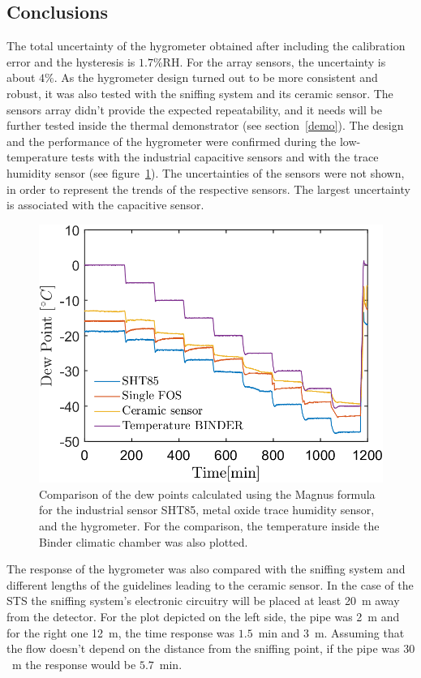 \subsection{Conclusions}
The total uncertainty of the hygrometer obtained after including the calibration error and the hysteresis is $1.7$\%RH. For the array sensors, the uncertainty is about $4\%$.
As the hygrometer design turned out to be more consistent and robust, it was also tested with the sniffing system and its ceramic sensor. The sensors array didn't provide the expected repeatability, and it needs will be further tested inside the thermal demonstrator (see section~\ref{demo}). The design and the performance of the hygrometer were confirmed during the low-temperature tests with the industrial capacitive sensors and with the trace humidity sensor (see figure~\ref{fig_comparison}). The uncertainties of the sensors were not shown, in order to represent the trends of the respective sensors. The largest uncertainty is associated with the capacitive sensor. 
\begin{figure}[!h]
\centering
\includegraphics[width=0.6\columnwidth]{Chapter5/images/DPCPercent.png}
\caption{Comparison of the dew points calculated using the Magnus formula for the industrial sensor SHT85, metal oxide trace humidity sensor, and the hygrometer. For the comparison, the temperature inside the Binder climatic chamber was also plotted.}
\label{fig_comparison}
\end{figure}
The response of the hygrometer was also compared with the sniffing system and different lengths of the guidelines leading to the ceramic sensor. In the case of the \gls{STS} the sniffing system's electronic circuitry will be placed at least \SI{20}{\metre} away from the detector. For the plot depicted on the left side, the pipe was \SI{2}{\metre} and for the right one \SI{12}{\metre}, the time response was $1.5$~min and $3$~m. Assuming that the flow doesn't depend on the distance from the sniffing point, if the pipe was $30$~m the response would be $5.7$~min. 
